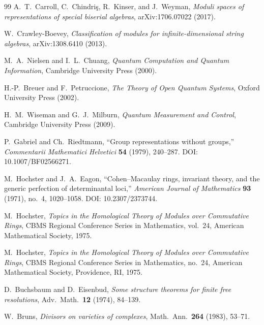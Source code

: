 \documentclass[11pt,oneside]{amsbook}
\numberwithin{equation}{section}
\theoremstyle{plain}
\theoremstyle{definition}
\theoremstyle{remark}
\begin{document}
\begin{thebibliography}{99}
A.~T.~Carroll, C.~Chindri\c{s}, R.~Kinser, and J.~Weyman,
\newblock \emph{Moduli spaces of representations of special biserial algebras},
\newblock arXiv:1706.07022 (2017).

W.~Crawley-Boevey,
\newblock \emph{Classification of modules for infinite-dimensional string algebras},
\newblock arXiv:1308.6410 (2013).

M.~A.~Nielsen and I.~L.~Chuang,
\newblock \emph{Quantum Computation and Quantum Information},
\newblock Cambridge University Press (2000).

H.-P.~Breuer and F.~Petruccione,
\newblock \emph{The Theory of Open Quantum Systems},
\newblock Oxford University Press (2002).

H.~M.~Wiseman and G.~J.~Milburn,
\newblock \emph{Quantum Measurement and Control},
\newblock Cambridge University Press (2009).




P.~Gabriel and Ch.~Riedtmann,
\newblock ``Group representations without groups,''
\newblock \emph{Commentarii Mathematici Helvetici} \textbf{54} (1979), 240--287. DOI: 10.1007/BF02566271.

M.~Hochster and J.~A.~Eagon,
\newblock ``Cohen--Macaulay rings, invariant theory, and the generic perfection of determinantal loci,''
\newblock \emph{American Journal of Mathematics} \textbf{93} (1971), no.~4, 1020--1058. DOI: 10.2307/2373744.

M.~Hochster,
\newblock \emph{Topics in the Homological Theory of Modules over Commutative Rings},
\newblock CBMS Regional Conference Series in Mathematics, vol.~24, American Mathematical Society, 1975.



M.~Hochster,
\newblock \emph{Topics in the Homological Theory of Modules over Commutative Rings},
\newblock CBMS Regional Conference Series in Mathematics, no.~24,
American Mathematical Society, Providence, RI, 1975.

D.~Buchsbaum and D.~Eisenbud,
\newblock \emph{Some structure theorems for finite free resolutions},
\newblock Adv.\ Math.\ \textbf{12} (1974), 84--139.

W.~Bruns,
\newblock \emph{Divisors on varieties of complexes},
\newblock Math.\ Ann.\ \textbf{264} (1983), 53--71.


\end{thebibliography}
\end{document}
